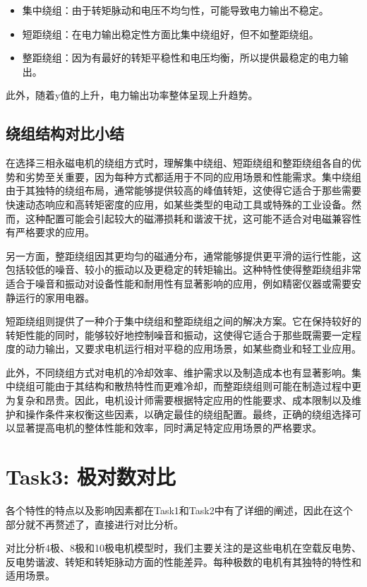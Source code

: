 \documentclass{thuemp}
\begin{document}
\begin{itemize}
	\item 集中绕组：由于转矩脉动和电压不均匀性，可能导致电力输出不稳定。
	\item 短距绕组：在电力输出稳定性方面比集中绕组好，但不如整距绕组。
	\item 整距绕组：因为有最好的转矩平稳性和电压均衡，所以提供最稳定的电力输出。
\end{itemize}
此外，随着y值的上升，电力输出功率整体呈现上升趋势。

\subsection{绕组结构对比小结}
在选择三相永磁电机的绕组方式时，理解集中绕组、短距绕组和整距绕组各自的优势和劣势至关重要，因为每种方式都适用于不同的应用场景和性能需求。集中绕组由于其独特的绕组布局，通常能够提供较高的峰值转矩，这使得它适合于那些需要快速动态响应和高转矩密度的应用，如某些类型的电动工具或特殊的工业设备。然而，这种配置可能会引起较大的磁滞损耗和谐波干扰，这可能不适合对电磁兼容性有严格要求的应用。

另一方面，整距绕组因其更均匀的磁通分布，通常能够提供更平滑的运行性能，这包括较低的噪音、较小的振动以及更稳定的转矩输出。这种特性使得整距绕组非常适合于噪音和振动对设备性能和耐用性有显著影响的应用，例如精密仪器或需要安静运行的家用电器。

短距绕组则提供了一种介于集中绕组和整距绕组之间的解决方案。它在保持较好的转矩性能的同时，能够较好地控制噪音和振动，这使得它适合于那些既需要一定程度的动力输出，又要求电机运行相对平稳的应用场景，如某些商业和轻工业应用。

此外，不同绕组方式对电机的冷却效率、维护需求以及制造成本也有显著影响。集中绕组可能由于其结构和散热特性而更难冷却，而整距绕组则可能在制造过程中更为复杂和昂贵。因此，电机设计师需要根据特定应用的性能要求、成本限制以及维护和操作条件来权衡这些因素，以确定最佳的绕组配置。最终，正确的绕组选择可以显著提高电机的整体性能和效率，同时满足特定应用场景的严格要求。

\section{Task3: 极对数对比}
各个特性的特点以及影响因素都在Task1和Task2中有了详细的阐述，因此在这个部分就不再赘述了，直接进行对比分析。

对比分析4极、8极和10极电机模型时，我们主要关注的是这些电机在空载反电势、
反电势谐波、转矩和转矩脉动方面的性能差异。每种极数的电机有其独特的特性和适用场景。
\end{document}
